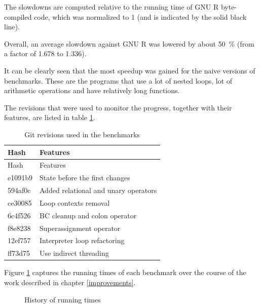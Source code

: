 The slowdowns are computed relative to the running time of GNU R byte-compiled code, which was normalized to 1 (and is indicated by the solid black line).

Overall, an average slowdown against GNU R was lowered by about 50~\% (from a factor of 1.678 to 1.336).

It can be clearly seen that the most speedup was gained for the naive versions of benchmarks. These are the programs that use a lot of nested loops, lot of arithmetic operations and have relatively long functions.

\todo[more]

The revisions that were used to monitor the progress, together with their features, are listed in table \ref{tab:git-rev}.

\begin{longtable}[c]{@{}ll@{}}
\caption{Git revisions used in the benchmarks\label{tab:git-rev}} \tabularnewline
\toprule
Hash & Features \tabularnewline
\midrule
\endfirsthead
\toprule
Hash & Features \tabularnewline
\midrule
\endhead
e1091b9 & State before the first changes \tabularnewline
594af0c & Added relational and unary operators \tabularnewline
ce30085 & Loop contexts removal \tabularnewline
6c4f526 & BC cleanup and colon operator \tabularnewline
f8e8238 & Superassignment operator \tabularnewline
12ef757 & Interpreter loop refactoring \tabularnewline
ff73d75 & Use indirect threading \tabularnewline
\bottomrule
\end{longtable}

Figure \ref{fig:history} captures the running times of each benchmark over the course of the work described in chapter \ref{improvements}.

\begin{figure}[htbp]
  \caption{\label{fig:history}History of running times}
  \centering
\end{figure}

